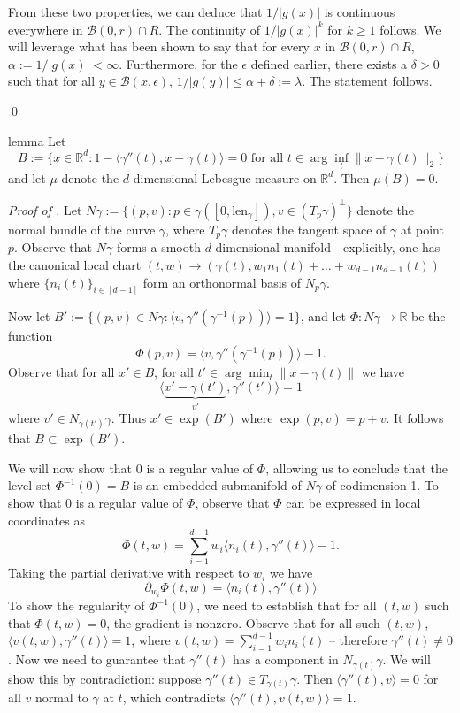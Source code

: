 \documentclass[11pt]{article}
\begin{document}
From these two properties, we can deduce that $1/|g(x)|$ is continuous everywhere in $\mathcal{B}(0,r) \cap R$. The continuity of $1/|g(x)|^k$ for $k\geq 1$ follows. We will leverage what has been shown to say that for every $x$ in $\mathcal{B}(0,r) \cap R$, $\alpha := 1/|g(x)| <\infty$. Furthermore, for the $\epsilon$ defined earlier, there exists a $\delta>0$ such that for all $y \in \mathcal{B}(x, \epsilon)$, $1/|g(y)| \leq \alpha+\delta := \lambda.$ The statement follows.

\qed{}

\begin{restatable}{lemma}{} \label{lemma: IFT degen}
    Let 
    \begin{equation} 
    B:= \{x \in \mathbb{R}^d : 1 - \langle\gamma''(t), x-\gamma(t)\rangle = 0 \text{ for all }t \in \arg\inf_t \|x-\gamma(t)\|_2\} \label{eq: ift degeneracy set}
    \end{equation}
    and let $\mu$ denote the $d$-dimensional Lebesgue measure on $\mathbb{R}^d$. Then $\mu(B) = 0.$
\end{restatable}
\noindent \textit{Proof of .} Let $N\gamma := \{(p, v) : p \in \gamma([0, \text{len}_{\gamma}]), v \in (T_p \gamma)^{\bot}\}$ denote the normal bundle of the curve $\gamma$, where $T_p\gamma$ denotes the tangent space of $\gamma$ at point $p$. Observe that $N\gamma$ forms a smooth $d$-dimensional manifold - explicitly, one has the canonical local chart $(t,w) \rightarrow (\gamma(t), w_1n_1(t) + \dots+w_{d-1}n_{d-1}(t))$ where $\{n_i(t)\}_{i\in [d-1]}$ form an orthonormal basis of $N_p\gamma$. 

Now let $B':= \{(p,v) \in N\gamma : \langle v,  \gamma''(\gamma^{-1}(p))\rangle = 1\}$, and let $\Phi:N\gamma \rightarrow \mathbb{R}$ be the function
\[\Phi(p,v) = \langle v, \gamma''(\gamma^{-1}(p))\rangle - 1.\]
Observe that for all $x' \in B$, for all $t' \in \arg\min_t \|x-\gamma(t)\|$ we have \[\langle \underbrace{x' - \gamma(t')}_{v'}, \gamma''(t')\rangle = 1\] where $v' \in N_{\gamma(t')}\gamma$. Thus $x' \in \exp(B')$ where $\exp(p,v) = p + v$. It follows that $B\subset \exp(B')$.

We will now show that $0$ is a regular value of $\Phi$, allowing us to conclude that the level set $\Phi^{-1}(0) = B$ is an embedded submanifold of $N\gamma$ of codimension 1. To show that $0$ is a regular value of $\Phi$, observe that $\Phi$ can be expressed in local coordinates as
\[\Phi(t,w) = \sum_{i = 1}^{d-1}w_i\langle n_i(t), \gamma''(t)\rangle - 1.\]
Taking the partial derivative with respect to $w_i$ we have
\[\partial_{w_i}\Phi(t,w) = \langle n_i(t), \gamma''(t)\rangle\]
To show the regularity of $\Phi^{-1}(0)$, we need to establish that for all $(t,w)$ such that $\Phi(t,w) = 0$, the gradient is nonzero. Observe that for all such $(t,w)$, $\langle v(t,w), \gamma''(t)\rangle = 1$, where $v(t,w) = \sum_{i = 1}^{d-1}w_in_{i}(t)$ -- therefore $\gamma''(t) \neq 0$. Now we need to guarantee that $\gamma''(t)$ has a component in $N_{\gamma(t)}\gamma$. We will show this by contradiction: suppose $\gamma''(t) \in T_{\gamma(t)}\gamma$. Then $\langle\gamma''(t), v\rangle = 0$ for all $v$ normal to $\gamma$ at $t$, which contradicts $\langle \gamma''(t), v(t,w) \rangle = 1$.
\end{document}
